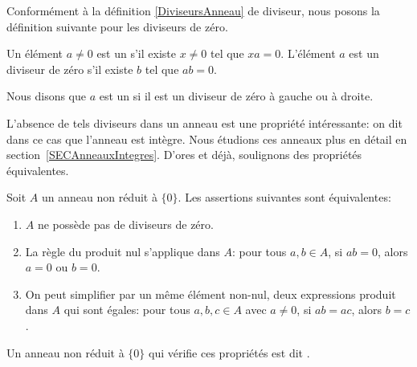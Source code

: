 Conformément à la définition \ref{DiviseursAnneau} de diviseur, nous posons la définition suivante pour les diviseurs de zéro.
\begin{definition}
    Un élément \( a\neq 0\) est un  s'il existe \( x\neq 0\) tel que $xa=0$. L'élément \( a\) est un diviseur de zéro  s'il existe \( b\) tel que \( ab=0\).

    Nous disons que \( a\) est un  si il est un diviseur de zéro à gauche ou à droite.
\end{definition}

L'absence de tels diviseurs dans un anneau est une propriété intéressante: on dit dans ce cas que l'anneau est intègre. Nous étudions ces anneaux plus en détail en section~\ref{SECAnneauxIntegres}. D'ores et déjà, soulignons des propriétés équivalentes.

\begin{propositionDef}           \label{DEFooTAOPooWDPYmd}
    Soit $A$ un anneau non réduit à \( \{ 0 \}\). Les assertions suivantes sont équivalentes:
    \begin{enumerate}
        \item       \label{ITEMooMXMKooXMYpkN}
            \( A\) ne possède pas de diviseurs de zéro.
        \item       \label{ITEMooLAJCooFwxXrV}
            La règle du produit nul s'applique dans $A$: pour tous \( a, b \in A \), si \( ab=0\), alors \( a = 0\) ou \( b = 0\).
        \item       \label{ITEMooQNTFooSRrVPK}
            On peut simplifier par un même élément non-nul, deux expressions produit dans $A$ qui sont égales: pour tous \( a, b, c \in A \) avec \( a \neq 0 \), si \( ab = ac \), alors \( b = c \).
    \end{enumerate}
    Un anneau non réduit à \( \{ 0 \}\) qui vérifie ces propriétés est dit .
\end{propositionDef}

